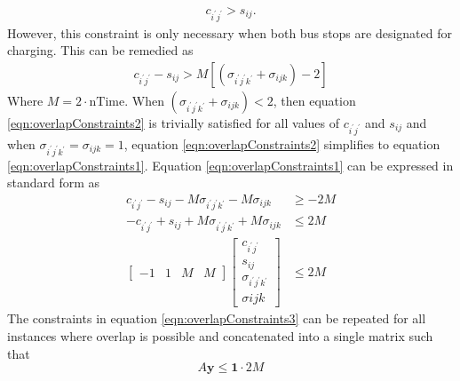 	\begin{align}\label{eqn:overlapConstraints1}
	c_{i^{'}j^{'}} > s_{ij}.
\end{align}
However, this constraint is only necessary when both bus stops are designated for charging. This can be remedied as
	\begin{align}\label{eqn:overlapConstraints2}
		c_{i^{'}j^{'}} - s_{ij} > M\left[(\sigma_{i^{'}j^{'}k^{'}} + \sigma_{ijk}) - 2\right]
	\end{align}
	Where $M = 2\cdot\text{nTime}$. When $(\sigma_{i^{'}j^{'}k^{'}} + \sigma_{ijk}) < 2$, then equation \ref{eqn:overlapConstraints2} is trivially satisfied for all values of $c_{i^{'}j^{'}}$ and $s_{ij}$ and when $\sigma_{i^{'}j^{'}k^{'}} = \sigma_{ijk} = 1$, equation \ref{eqn:overlapConstraints2} simplifies to equation \ref{eqn:overlapConstraints1}. Equation \ref{eqn:overlapConstraints1} can be expressed in standard form as 
	\begin{align}\label{eqn:overlapConstraints3}
		c_{i^{'}j^{'}} - s_{ij} - M\sigma_{i^{'}j^{'}k^{'}} - M\sigma_{ijk} &\ge -2M \\
		-c_{i^{'}j^{'}} + s_{ij} + M\sigma_{i^{'}j^{'}k^{'}} + M\sigma_{ijk} &\le 2M \\
		\begin{bmatrix} -1 & 1 & M & M\end{bmatrix} \begin{bmatrix}c_{i^{'}j^{'}}\\ s_{ij} \\ \sigma_{i^{'}j^{'}k^{'}}\\ \sigma{ijk} \end{bmatrix} &\le 2M
	\end{align}
	The constraints in equation \ref{eqn:overlapConstraints3} can be repeated for all instances where overlap is possible and concatenated into a single matrix such that
	\begin{equation}
		A\mathbf{y} \le \mathbf{1}\cdot 2M
	\end{equation}



